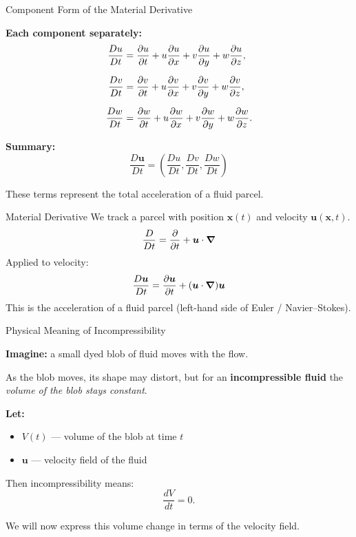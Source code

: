 \documentclass[aspectratio=169]{beamer}
\newcommand{\uu}{\bm{u}}
\newcommand{\x}{\bm{x}}
\begin{document}
\begin{frame}{Component Form of the Material Derivative}

\textbf{Each component separately:}
\begin{align*}
\frac{Du}{Dt} &= \pdv{u}{t} + u\pdv{u}{x} + v\pdv{u}{y} + w\pdv{u}{z},\\[6pt]
\frac{Dv}{Dt} &= \pdv{v}{t} + u\pdv{v}{x} + v\pdv{v}{y} + w\pdv{v}{z},\\[6pt]
\frac{Dw}{Dt} &= \pdv{w}{t} + u\pdv{w}{x} + v\pdv{w}{y} + w\pdv{w}{z}.
\end{align*}

\vspace{0.3cm}

\textbf{Summary:}
\[
\boxed{
\frac{D\bm{u}}{Dt}
= \left(
\frac{Du}{Dt},
\frac{Dv}{Dt},
\frac{Dw}{Dt}
\right)
}
\]

\vspace{0.3cm}

These terms represent the total acceleration of a fluid parcel.

\end{frame}

\begin{frame}{Material Derivative}
We track a parcel with position $\x(t)$ and velocity $\uu(\x,t)$.
\[
\frac{D}{Dt} = \pdv{}{t} + \uu\cdot\grad
\]
Applied to velocity:
\[
\frac{D\uu}{Dt} = \pdv{\uu}{t} + (\uu\cdot\grad)\uu
\]
This is the acceleration of a fluid parcel (left-hand side of Euler / Navier--Stokes).
\end{frame}

\begin{frame}{Physical Meaning of Incompressibility}

\textbf{Imagine:} a small dyed blob of fluid moves with the flow.

\vspace{0.4cm}

As the blob moves, its shape may distort, but for an
\textbf{incompressible fluid} the \textit{volume of the blob stays constant}.

\vspace{0.4cm}

\textbf{Let:}
\begin{itemize}
  \item $V(t)$ — volume of the blob at time $t$
  \item $\bm{u}$ — velocity field of the fluid
\end{itemize}

Then incompressibility means:
\[
\boxed{\frac{dV}{dt} = 0.}
\]

\vspace{0.4cm}

We will now express this volume change in terms of the velocity field.
\end{frame}
\end{document}
